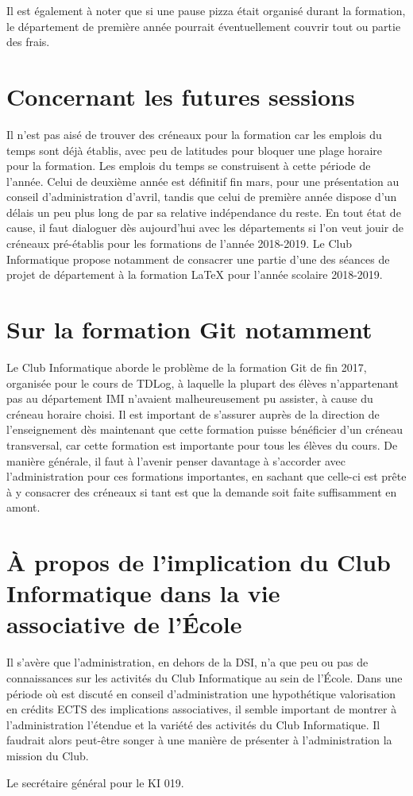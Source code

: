 \documentclass[12pt,twoside]{article}
\begin{document}
Il est également à noter que si une pause pizza était organisé durant la formation, le département de première année pourrait éventuellement couvrir tout ou partie des frais.

\section*{Concernant les futures sessions}

Il n'est pas aisé de trouver des créneaux pour la formation car les emplois du temps sont déjà établis, avec peu de latitudes pour bloquer une plage horaire pour la formation. Les emplois du temps se construisent à cette période de l'année. Celui de deuxième année est définitif fin mars, pour une présentation au conseil d'administration d'avril, tandis que celui de première année dispose d'un délais un peu plus long de par sa relative indépendance du reste. En tout état de cause, il faut dialoguer dès aujourd'hui avec les départements si l'on veut jouir de créneaux pré-établis pour les formations de l'année 2018-2019. Le Club Informatique propose notamment de consacrer une partie d'une des séances de projet de département à la formation \LaTeX\: pour l'année scolaire 2018-2019.

\section*{Sur la formation Git notamment}

Le Club Informatique aborde le problème de la formation Git de fin 2017, organisée pour le cours de TDLog, à laquelle la plupart des élèves n'appartenant pas au département IMI n'avaient malheureusement pu assister, à cause du créneau horaire choisi. Il est important de s'assurer auprès de la direction de l'enseignement dès maintenant que cette formation puisse bénéficier d'un créneau transversal, car cette formation est importante pour tous les élèves du cours. De manière générale, il faut à l'avenir penser davantage à s'accorder avec l'administration pour ces formations importantes, en sachant que celle-ci est prête à y consacrer des créneaux si tant est que la demande soit faite suffisamment en amont.


\section*{À propos de l'implication du Club Informatique dans la vie associative de l'École}

Il s'avère que l'administration, en dehors de la DSI, n'a que peu ou pas de connaissances sur les activités du Club Informatique au sein de l'École. Dans une période où est discuté en conseil d'administration une hypothétique valorisation en crédits ECTS des implications associatives, il semble important de montrer à l'administration l'étendue et la variété des activités du Club Informatique. Il faudrait alors peut-être songer à une manière de présenter à l'administration la mission du Club.

\begin{flushright}
Le secrétaire général pour le KI 019.
\end{flushright}
\end{document}
